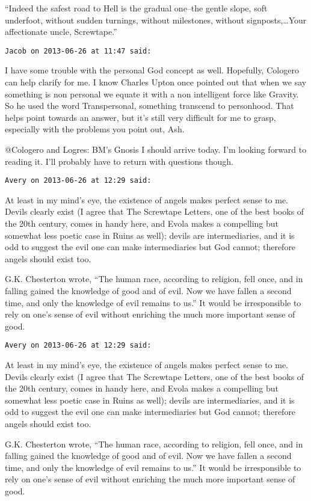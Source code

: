 \begin{footnotesize}
\begin{sffamily}
“Indeed the safest road to Hell is the gradual one–the gentle slope, soft underfoot, without sudden turnings, without milestones, without signposts,…Your affectionate uncle, Screwtape.”


\hfill

\texttt{Jacob on 2013-06-26 at 11:47 said: }

I have some trouble with the personal God concept as well. Hopefully, Cologero can help clarify for me. I know Charles Upton once pointed out that when we say something is non personal we equate it with a non intelligent force like Gravity. So he used the word Transpersonal, something transcend to personhood. That helps point towards an answer, but it's still very difficult for me to grasp, especially with the problems you point out, Ash. 

@Cologero and Logres: BM's Gnosis I should arrive today. I'm looking forward to reading it. I'll probably have to return with questions though.


\hfill

\texttt{Avery on 2013-06-26 at 12:29 said: }

At least in my mind's eye, the existence of angels makes perfect sense to me. Devils clearly exist (I agree that The Screwtape Letters, one of the best books of the 20th century, comes in handy here, and Evola makes a compelling but somewhat less poetic case in Ruins as well); devils are intermediaries, and it is odd to suggest the evil one can make intermediaries but God cannot; therefore angels should exist too.

G.K. Chesterton wrote, “The human race, according to religion, fell once, and in falling gained the knowledge of good and of evil. Now we have fallen a second time, and only the knowledge of evil remains to us.” It would be irresponsible to rely on one's sense of evil without enriching the much more important sense of good.


\hfill

\texttt{Avery on 2013-06-26 at 12:29 said: }

At least in my mind's eye, the existence of angels makes perfect sense to me. Devils clearly exist (I agree that The Screwtape Letters, one of the best books of the 20th century, comes in handy here, and Evola makes a compelling but somewhat less poetic case in Ruins as well); devils are intermediaries, and it is odd to suggest the evil one can make intermediaries but God cannot; therefore angels should exist too.

G.K. Chesterton wrote, “The human race, according to religion, fell once, and in falling gained the knowledge of good and of evil. Now we have fallen a second time, and only the knowledge of evil remains to us.” It would be irresponsible to rely on one's sense of evil without enriching the much more important sense of good.



\end{sffamily}
\end{footnotesize}
